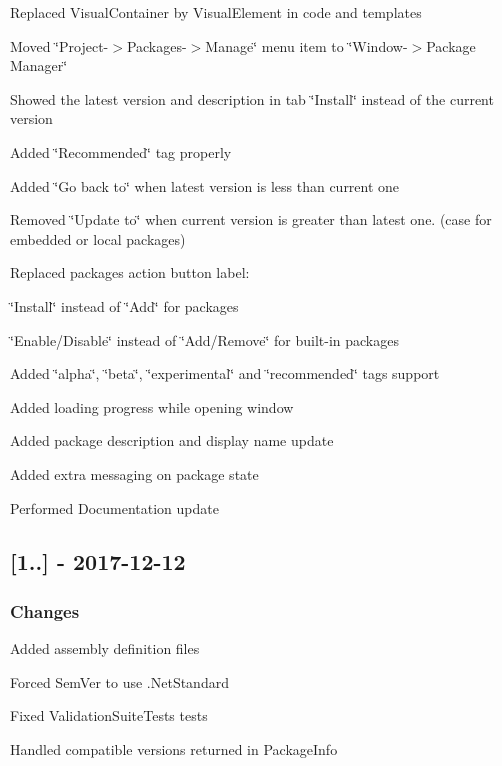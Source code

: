 \begin{DoxyItemize}
\item Replaced Visual\+Container by Visual\+Element in code and templates
\item Moved \char`\"{}\+Project-\/$>$\+Packages-\/$>$\+Manage\char`\"{} menu item to \char`\"{}\+Window-\/$>$\+Package Manager\char`\"{}
\item Showed the latest version and description in tab \char`\"{}\+Install\char`\"{} instead of the current version
\item Added \char`\"{}\+Recommended\char`\"{} tag properly
\item Added \char`\"{}\+Go back to\char`\"{} when latest version is less than current one
\item Removed \char`\"{}\+Update to\char`\"{} when current version is greater than latest one. (case for embedded or local packages)
\item Replaced packages action button label\+:
\begin{DoxyItemize}
\item \char`\"{}\+Install\char`\"{} instead of \char`\"{}\+Add\char`\"{} for packages
\item \char`\"{}\+Enable/\+Disable\char`\"{} instead of \char`\"{}\+Add/\+Remove\char`\"{} for built-\/in packages
\end{DoxyItemize}
\item Added \char`\"{}alpha\char`\"{}, \char`\"{}beta\char`\"{}, \char`\"{}experimental\char`\"{} and \char`\"{}recommended\char`\"{} tags support
\item Added loading progress while opening window
\item Added package description and display name update
\item Added extra messaging on package state
\item Performed Documentation update
\end{DoxyItemize}

\subsection*{\mbox{[}1..\mbox{]} -\/ 2017-\/12-\/12}

\subsubsection*{Changes}


\begin{DoxyItemize}
\item Added assembly definition files
\item Forced Sem\+Ver to use .Net\+Standard
\item Fixed Validation\+Suite\+Tests tests
\item Handled compatible versions returned in Package\+Info
\end{DoxyItemize}

